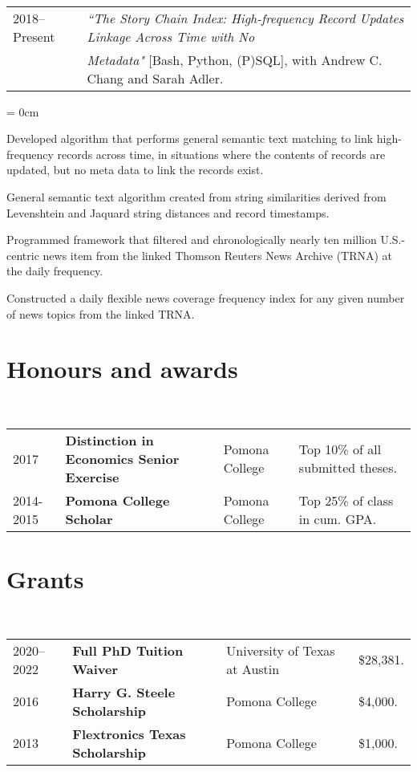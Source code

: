 \documentclass[a4paper, 11pt]{article}
\begin{document}
      \vspace*{1em}
      
      ~\begin{tabular}{ll}
        2018--Present & \textit{``The Story Chain Index: High-frequency Record Updates Linkage Across Time with No}\\
        & \textit{Metadata"} {[Bash, Python, (P)SQL]}, with Andrew C. Chang and Sarah Adler.
      \end{tabular}
      \begin{compactitem}\parskip = 0cm
        \item Developed algorithm that performs general semantic text matching to link high-frequency records across time, in situations where the contents of records are updated, but no meta data to link the records exist.
        \item General semantic text algorithm created from string similarities derived from Levenshtein and Jaquard string distances and record timestamps.
        \item Programmed framework that filtered and chronologically nearly ten million U.S.-centric news item from the linked Thomson Reuters News Archive (TRNA) at the daily frequency.
        \item Constructed a daily flexible news coverage frequency index for any given number of news topics from the linked TRNA.
      \end{compactitem}
      
    \section{Honours and awards}
      ~\begin{tabular}{llll}
        2017 & \textbf{Distinction in Economics Senior Exercise} & Pomona College & Top 10\% of all submitted theses.\\
        2014-2015 & \textbf{Pomona College Scholar} & Pomona College & Top 25\% of class in cum. GPA.\\
      \end{tabular}
      
    \section{Grants}
      ~\begin{tabular}{llll}
        2020--2022 & \textbf{Full PhD Tuition Waiver} & University of Texas at Austin & \$28,381. \\
        2016 & \textbf{Harry G. Steele Scholarship} & Pomona College & \$4,000.\\
        2013 & \textbf{Flextronics Texas Scholarship} & Pomona College & \$1,000.
      \end{tabular}
      
\end{document}
